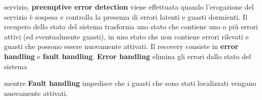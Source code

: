 \documentclass[14pt]{extarticle}
\begin{document}
servizio, \textbf{preemptive error detection} viene effettuata quando l'erogazione del
servizio è sospesa e controlla la presenza di errori latenti e guasti dormienti.
Il recupero dello stato del sistema trasforma uno stato che contiene uno o più
errori attivi (ed eventualmente guasti), in uno stato che non contiene errori
rilevati e guasti che possono essere nuovamente attivati. Il recovery consiste
in \textbf{error handling} e \textbf{fault handling}. \textbf{Error handling} elimina gli errori dallo
stato del sistema 
 mentre \textbf{Fault handling} impedisce che i guasti che sono
stati localizzati vengano nuovamente attivati. 
\end{document}
